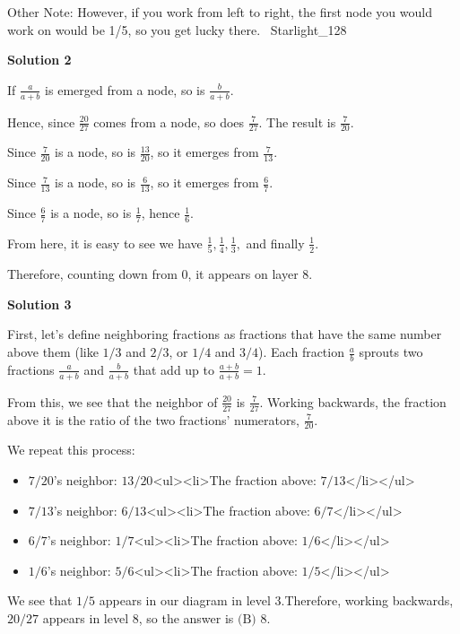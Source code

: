 \begin{enumerate}
 Other Note: However, if you work from left to right, the first node you would work on would be 1/5, so you get lucky there. ~Starlight\_128

 



\textbf{Solution 2}

If $\frac{a}{a+b}$ is emerged from a node, so is $\frac{b}{a+b}$.

 Hence, since $\frac{20}{27}$ comes from a node, so does $\frac{7}{27}$. The result is $\frac{7}{20}$.

 Since $\frac{7}{20}$ is a node, so is $\frac{13}{20}$, so it emerges from $\frac{7}{13}$.

 Since $\frac{7}{13}$ is a node, so is $\frac{6}{13}$, so it emerges from $\frac{6}{7}$.

 Since $\frac{6}{7}$ is a node, so is $\frac{1}{7}$, hence $\frac{1}{6}$.

 From here, it is easy to see we have $\frac{1}{5}, \frac{1}{4}, \frac{1}{3},$ and finally $\frac{1}{2}$.

 Therefore, counting down from 0, it appears on layer $\boxed{8}$.

 



\textbf{Solution 3}

First, let's define neighboring fractions as fractions that have the same number above them (like $1/3$ and $2/3$, or $1/4$ and $3/4$). Each fraction $\frac{a}{b}$ sprouts two fractions $\frac{a}{a+b}$ and $\frac{b}{a+b}$ that add up to $\frac{a+b}{a+b}=1$.

 From this, we see that the neighbor of $\frac{20}{27}$ is $\frac{7}{27}$. Working backwards, the fraction above it is the ratio of the two fractions' numerators, $\frac{7}{20}$.

 We repeat this process:

 
            \begin{itemize}
        \item $7/20$'s neighbor: $13/20$<ul><li>The fraction above: $7/13$</li></ul>
        \item $7/13$'s neighbor: $6/13$<ul><li>The fraction above: $6/7$</li></ul>
        \item $6/7$'s neighbor: $1/7$<ul><li>The fraction above: $1/6$</li></ul>
        \item $1/6$'s neighbor: $5/6$<ul><li>The fraction above: $1/5$</li></ul>
            \end{itemize}
            We see that $1/5$ appears in our diagram in level 3.Therefore, working backwards, $20/27$ appears in level 8, so the answer is $\boxed{\text{(B) 8}}$.


\end{enumerate}
